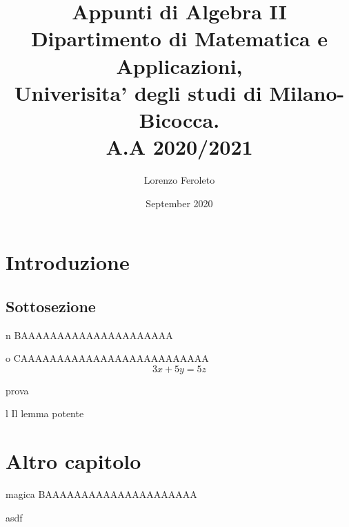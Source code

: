 \documentclass{article}
\title{
  \Large{\bf{Appunti di Algebra II}} \\
  Dipartimento di Matematica e Applicazioni,\\
  Univerisita' degli studi di Milano-Bicocca. \\
  A.A 2020/2021
}
\author{Lorenzo Feroleto}
\date{September 2020}
\begin{document}
\maketitle
\newpage

\section{Introduzione}

\subsection{Sottosezione}

\lipsum[2]

\begin{defn}{n}
BAAAAAAAAAAAAAAAAAAAAA
\end{defn}

\lipsum[3]

\begin{theo}{o}
CAAAAAAAAAAAAAAAAAAAAAAAAAA
\[3x + 5y = 5z\]
\end{theo}
\begin{dimostrazione}
prova
\end{dimostrazione}

\begin{lem}[Il lemmone]{l}
Il lemma potente
\end{lem}

\section{Altro capitolo}
\begin{defn}{magica}
  BAAAAAAAAAAAAAAAAAAAAA
\end{defn}

\begin{dimostrazione} 
asdf
\end{dimostrazione}
\end{document}
